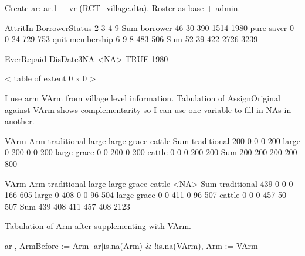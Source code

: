 Create \textsf{ar}: \textsf{ar.1} + \textsf{vr} (RCT\_village.dta). Roster as base + admin.
\begin{Schunk}
\begin{Soutput}
                 AttritIn
BorrowerStatus       2    3    4    9  Sum
  borrower          46   30  390 1514 1980
  pure saver         0    0   24  729  753
  quit membership    6    9    8  483  506
  Sum               52   39  422 2726 3239
\end{Soutput}
\begin{Soutput}
          EverRepaid
DisDate3NA <NA>
      TRUE 1980
\end{Soutput}
\begin{Soutput}
< table of extent 0 x 0 >
\end{Soutput}
\end{Schunk}
I use arm \textsf{VArm} from village level information. Tabulation of \textsf{AssignOriginal} against \textsf{VArm} shows complementarity so I can use one variable to fill in NAs in another.
\begin{Schunk}
\begin{Soutput}
             VArm
Arm           traditional large large grace cattle Sum
  traditional         200     0           0      0 200
  large                 0   200           0      0 200
  large grace           0     0         200      0 200
  cattle                0     0           0    200 200
  Sum                 200   200         200    200 800
\end{Soutput}
\begin{Soutput}
             VArm
Arm           traditional large large grace cattle <NA>  Sum
  traditional         439     0           0      0  166  605
  large                 0   408           0      0   96  504
  large grace           0     0         411      0   96  507
  cattle                0     0           0    457   50  507
  Sum                 439   408         411    457  408 2123
\end{Soutput}
\end{Schunk}
Tabulation of \textsf{Arm} after supplementing with \textsf{VArm}.
\begin{Schunk}
\begin{Sinput}
ar[, ArmBefore := Arm]
ar[is.na(Arm) & !is.na(VArm), Arm := VArm]
\end{Sinput}
\end{Schunk}
